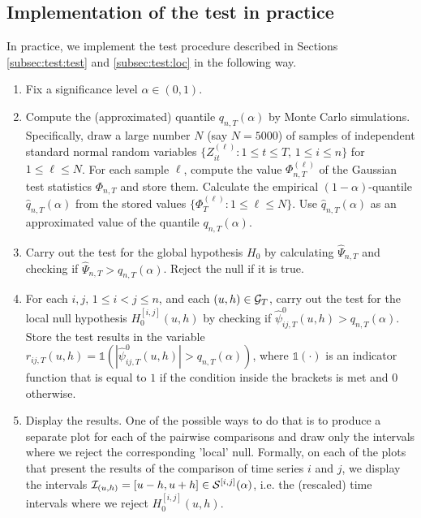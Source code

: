 \documentclass[a4paper,12pt]{article}
\begin{document}
\subsection{Implementation of the test in practice}\label{subsec:test:impl}

In practice, we implement the test procedure described in Sections \ref{subsec:test:test} and \ref{subsec:test:loc} in the following way. 
\begin{enumerate}[label=\textit{Step \arabic*.}, leftmargin=1.45cm]
\item Fix a significance level $\alpha \in (0, 1)$. 
\item Compute the (approximated) quantile $q_{n, T}(\alpha)$ by Monte Carlo simulations. Specifically, draw a large number $N$ (say $N=5000$) of samples of independent standard normal random variables $\{Z_{it}^{(\ell)} : 1 \le t \le T, \, 1 \le i \le n \}$ for $1 \le \ell \le N$. For each sample $\ell$, compute the value $\Phi_{n,T}^{(\ell)}$ of the Gaussian test statistics $\Phi_{n, T}$ and store them. Calculate the empirical $(1-\alpha)$-quantile $\hat{q}_{n, T}(\alpha)$ from the stored values $\{ \Phi_T^{(\ell)}: 1 \le \ell \le N \}$. Use $\hat{q}_{n, T}(\alpha)$ as an approximated value of the quantile $q_{n, T}(\alpha)$.
\item Carry out the test for the global hypothesis $H_0$ by calculating $\widehat{\Psi}_{n, T}$ and checking if $\widehat{\Psi}_{n, T} > q_{n, T}(\alpha)$. Reject the null if it is true.
\item For each $i, j,\, 1 \le i < j \le n$, and each $(u, h) \in \mathcal{G}_T$, carry out the test for the local null hypothesis $H_0^{[i, j]}(u, h)$ by checking if $\hat{\psi}^0_{ij, T}(u, h)> q_{n, T}(\alpha)$. Store the test results in the variable $r_{ij,T}(u, h) = \mathds{1}( |\hat{\psi}_{ij,T}^0(u, h)| > q_{n, T}(\alpha))$, where $\mathds{1}(\cdot)$ is an indicator function that is equal to $1$ if the condition inside the brackets is met and $0$ otherwise.
\item Display the results. One of the possible ways to do that is to produce a separate plot for each of the pairwise comparisons and draw only the intervals where we reject the corresponding 'local' null. Formally, on each of the plots that present the results of the comparison of time series $i$ and $j$, we display the intervals $\mathcal{I}_{(u, h)} = [u- h, u+h] \in \mathcal{S}^{[i, j]}(\alpha)$, i.e. the (rescaled) time intervals where we reject $H_0^{[i, j]}(u, h)$. 
\end{enumerate}
\end{document}
